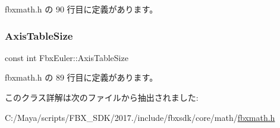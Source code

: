  fbxmath.\+h の 90 行目に定義があります。

\mbox{\label{class_fbx_euler_aa7c81e68be87ae5c26810eba96ede9ba}} 
\subsubsection{\texorpdfstring{Axis\+Table\+Size}{AxisTableSize}}
{\footnotesize\ttfamily const int Fbx\+Euler\+::\+Axis\+Table\+Size\hspace{0.3cm}{\ttfamily [static]}}



 fbxmath.\+h の 89 行目に定義があります。



このクラス詳解は次のファイルから抽出されました\+:\begin{DoxyCompactItemize}
\item 
C\+:/\+Maya/scripts/\+F\+B\+X\+\_\+\+S\+D\+K/2017./include/fbxsdk/core/math/\hyperlink{fbxmath_8h}{fbxmath.\+h}\end{DoxyCompactItemize}

